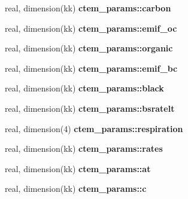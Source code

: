 \begin{DoxyCompactItemize}
\item 
\hypertarget{namespacectem__params_ac5036f140f527e6ea6e3cac40808df21}{}real, dimension(kk) {\bfseries ctem\+\_\+params\+::carbon}\label{namespacectem__params_ac5036f140f527e6ea6e3cac40808df21}

\item 
\hypertarget{namespacectem__params_a430c392f52f3c3c0be45b52919c33da9}{}real, dimension(kk) {\bfseries ctem\+\_\+params\+::emif\+\_\+oc}\label{namespacectem__params_a430c392f52f3c3c0be45b52919c33da9}

\item 
\hypertarget{namespacectem__params_a134b75c070e655171147e005a9fe9aeb}{}real, dimension(kk) {\bfseries ctem\+\_\+params\+::organic}\label{namespacectem__params_a134b75c070e655171147e005a9fe9aeb}

\item 
\hypertarget{namespacectem__params_a4cee3e6d838d5971990e283211e601e6}{}real, dimension(kk) {\bfseries ctem\+\_\+params\+::emif\+\_\+bc}\label{namespacectem__params_a4cee3e6d838d5971990e283211e601e6}

\item 
\hypertarget{namespacectem__params_afa7732a7e5f1e593845212fd25c6d968}{}real, dimension(kk) {\bfseries ctem\+\_\+params\+::black}\label{namespacectem__params_afa7732a7e5f1e593845212fd25c6d968}

\item 
\hypertarget{namespacectem__params_a9ba355c48c189d4bbe0db06896779c1f}{}real, dimension(kk) {\bfseries ctem\+\_\+params\+::bsratelt}\label{namespacectem__params_a9ba355c48c189d4bbe0db06896779c1f}

\item 
\hypertarget{namespacectem__params_ac0e3b5f3fc7675f294f5fd35c7d6fb51}{}real, dimension(4) {\bfseries ctem\+\_\+params\+::respiration}\label{namespacectem__params_ac0e3b5f3fc7675f294f5fd35c7d6fb51}

\item 
\hypertarget{namespacectem__params_ab7f0cbae8250a9df009fa5e7a09db9dd}{}real, dimension(kk) {\bfseries ctem\+\_\+params\+::rates}\label{namespacectem__params_ab7f0cbae8250a9df009fa5e7a09db9dd}

\item 
\hypertarget{namespacectem__params_a2704de6cef02e4d7b844d005141a35f6}{}real, dimension(kk) {\bfseries ctem\+\_\+params\+::at}\label{namespacectem__params_a2704de6cef02e4d7b844d005141a35f6}

\item 
\hypertarget{namespacectem__params_aefab76e3733b15ee2b9ed0828e5b86a7}{}real, dimension(kk) {\bfseries ctem\+\_\+params\+::c}\label{namespacectem__params_aefab76e3733b15ee2b9ed0828e5b86a7}


\end{DoxyCompactItemize}
